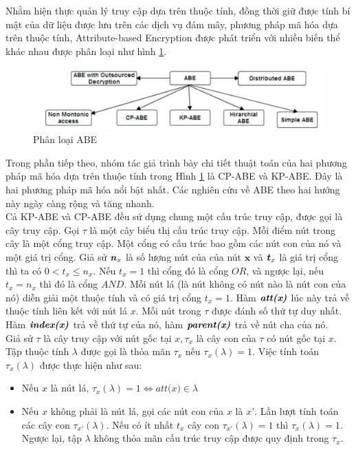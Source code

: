 Nhằm hiện thực quản lý truy cập dựa trên thuộc tính, đồng thời giữ được tính bí
mật của dữ liệu được lưu trên các dịch vụ đám mây, phương pháp mã hóa dựa trên thuộc tính, Attribute-based Encryption được phát triển với nhiều biến thể khác nhau được phân
loại như hình \ref{fig:chap2-abe-classified}.
\begin{figure}
    \centering
    \includegraphics[scale=0.5]{graphics/chapter-2/chap2-abe-classified.png}
    \caption{Phân loại ABE}
    \label{fig:chap2-abe-classified}
\end{figure}
Trong phần tiếp theo, nhóm tác giả trình bày chi tiết thuật toán của hai phương
pháp mã hóa dựa trên thuộc tính trong Hình \ref{fig:chap2-abe-classified} là CP-ABE và KP-ABE. Đây là hai
phương pháp mã hóa nổi bật nhất. Các nghiên cứu về ABE theo hai hướng này ngày
càng rộng và tăng nhanh. \\

Cả KP-ABE và CP-ABE đều sử dụng chung một cấu trúc truy cập, được gọi là
cây truy cập. Gọi $\tau $ là một cây biểu thị cấu trúc truy cập. Mỗi điểm nút trong cây là một cổng truy cập. Một cổng có cấu trúc bao gồm các nút con của nó và một giá trị cổng. Giả sử $\textbf{\textit{n}}_x$ là số lượng nút của của nút $\textbf{x}$ và $\textbf{\textit{t}}_x$ là giá trị cổng thì ta có $0 < \textit{t}_x \leq \textit{n}_x$. Nếu $\textit{t}_x = 1$ thì cổng đó là cổng $OR$, và ngược lại, nếu $\textit{t}_x = \textit{n}_x$ thì đó là cổng $AND$. Mỗi nút lá (là
nút không có nút nào là nút con của nó) diễn giải một thuộc tính và có giá trị cổng $\textit{t}_x = 1$. Hàm $\textbf{\textit{att(x)}}$ lúc này trả về thuộc tính liên kết với nút lá $\textit{x}$. Mỗi nút trong $\tau$ được đánh số thứ tự duy nhất. Hàm $\textbf{\textit{index(x)}}$ trả về thứ tự của nó, hàm $\textbf{\textit{parent(x)}}$ trả về nút cha của nó.\\

Giả sử $\tau$ là cây truy cập với nút gốc tại $\textit{x}, \tau_x$ là cây con của $\tau$ có nút gốc tại $\textit{x}$. Tập thuộc tính $\lambda$ được gọi là thỏa mãn $\tau_x$ nếu $\tau_x(\lambda) = 1$. Việc tính toán $\tau_x(\lambda)$ được thực hiện như sau:
\begin{itemize}
    \item Nếu $\textit{x}$ là nút lá, $\tau_x(\lambda) = 1 \iff \textit{att(x)} \in \lambda$
    \item Nếu $\textit{x}$ không phải là nút lá, gọi các nút con của $\textit{x}$  là $\textit{x'}$. Lần lượt tính toán các cây con $\tau_{x'}(\lambda)$. Nếu có ít nhất $t_x$ cây con $\tau_{x'}(\lambda) = 1$ thì $\tau_{x}(\lambda) = 1$. Ngược lại, tập $\lambda$ không thỏa mãn cấu trúc truy cập được quy định trong $\tau_{x}$.
\end{itemize}
